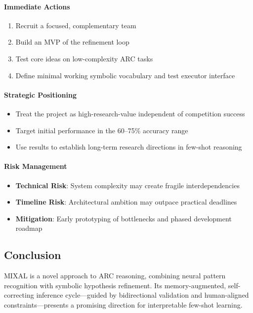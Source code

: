 \documentclass[12pt]{article}
\begin{document}
\paragraph{Immediate Actions}
\begin{enumerate}
\item Recruit a focused, complementary team
\item Build an MVP of the refinement loop
\item Test core ideas on low-complexity ARC tasks
\item Define minimal working symbolic vocabulary and test executor interface
\end{enumerate}

\paragraph{Strategic Positioning}
\begin{itemize}
\item Treat the project as high-research-value independent of competition success
\item Target initial performance in the 60–75\% accuracy range
\item Use results to establish long-term research directions in few-shot reasoning
\end{itemize}

\paragraph{Risk Management}
\begin{itemize}
\item\textbf{Technical Risk}: System complexity may create fragile interdependencies
\item\textbf{Timeline Risk}: Architectural ambition may outpace practical deadlines
\item\textbf{Mitigation}: Early prototyping of bottlenecks and phased development roadmap
\end{itemize}

\subsection*{Conclusion}

MIXAL is a novel approach to ARC reasoning, combining neural pattern recognition with symbolic hypothesis refinement. Its memory-augmented, self-correcting inference cycle—guided by bidirectional validation and human-aligned constraints—presents a promising direction for interpretable few-shot learning.
\end{document}
